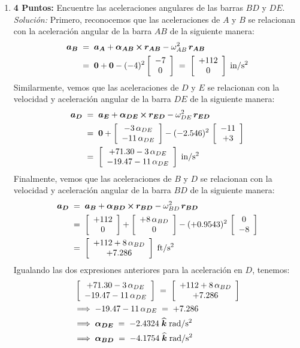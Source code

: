 \documentclass[ a4paper, twoside, 11pt]{article}
\begin{document}
\begin{problem}
\begin{enumerate}[label=\textbf{\alph*)}]
\item \textbf{4 Puntos:} Encuentre las aceleraciones angulares de las barras $BD$ y $DE$. \\[1ex]
\emph{Soluci\'on:} Primero, reconocemos que las aceleraciones de $A$ y $B$ se relacionan con la aceleraci\'on angular de la barra $AB$ de la siguiente manera: 
\begin{align*}
{\boldsymbol{a_B}} \;
& = \; {\boldsymbol{a_A}} + {\boldsymbol{\alpha_{AB}}} \,{\boldsymbol{\times}}\, {\boldsymbol{r_{AB}}} - \omega_{AB}^2 \, {\boldsymbol{r_{AB}}} \\
& = \; {\boldsymbol{0}} + {\boldsymbol{0}} -(-4)^2 \left[ \begin{array}{c} -7 \\ 0 \end{array} \right] \; = \; \left[ \begin{array}{c} +112 \\ 0 \end{array} \right] \; \text{in/s\ensuremath{^{\text{2}}}}
\end{align*}
Similarmente, vemos que las aceleraciones de $D$ y $E$ se relacionan con la velocidad y aceleraci\'on angular de la barra $DE$ de la siguiente manera: 
\begin{align*}
{\boldsymbol{a_D}} \;
& = \; {\boldsymbol{a_E}} + {\boldsymbol{\alpha_{DE}}} \,{\boldsymbol{\times}}\, {\boldsymbol{r_{ED}}} - \omega_{DE}^2 \, {\boldsymbol{r_{ED}}} \\
& = \; {\boldsymbol{0}} + \left[ \begin{array}{c}  -3 \, \alpha_{DE} \\  -11 \, \alpha_{DE} \end{array} \right] - (-2.546)^2 \, \left[ \begin{array}{c} -11 \\ +3 \end{array} \right] \\
& = \; 
\left[ \begin{array}{c}  +71.30 - 3 \, \alpha_{DE} \\  -19.47 - 11 \, \alpha_{DE} \end{array} \right] \; \text{in/s\ensuremath{^{\text{2}}}}
\end{align*}
Finalmente, vemos que las aceleraciones de $B$ y $D$ se relacionan con la velocidad y aceleraci\'on angular de la barra $BD$ de la siguiente manera: 
\begin{align*}
{\boldsymbol{a_D}} \;
& = \; {\boldsymbol{a_B}} + {\boldsymbol{\alpha_{BD}}} \,{\boldsymbol{\times}}\, {\boldsymbol{r_{BD}}} - \omega_{BD}^2 \, {\boldsymbol{r_{BD}}} \\
& = \; \left[ \begin{array}{c} +112 \\ 0 \end{array} \right] + \left[ \begin{array}{c}  +8 \, \alpha_{BD} \\ 0 \end{array} \right] - (+0.9543)^2 \, \left[ \begin{array}{c} 0 \\ -8 \end{array} \right] \\
& = \; 
\left[ \begin{array}{c}  +112 + 8 \, \alpha_{BD} \\ +7.286 \end{array} \right] \; \text{ft/s\ensuremath{^{\text{2}}}}
\end{align*}
Igualando las dos expresiones anteriores para la aceleraci\'on en $D$, tenemos: 
\begin{align*}
&
\left[ \begin{array}{c}  +71.30 - 3 \, \alpha_{DE} \\  -19.47 - 11 \, \alpha_{DE} \end{array} \right] \; = \; \left[ \begin{array}{c}  +112 + 8 \, \alpha_{BD} \\ +7.286 \end{array} \right] \\
& \Longrightarrow \;
-19.47 - 11 \, \alpha_{DE} \; = \; +7.286 \\
& \Longrightarrow \;
{\boldsymbol{\alpha_{DE}}} \; = \; -2.4324 \; {\boldsymbol{\widehat{k}}} \; \text{rad/s\ensuremath{^{\text{2}}}} \\
& \Longrightarrow \;
{\boldsymbol{\alpha_{BD}}} \; = \; -4.1754 \; {\boldsymbol{\widehat{k}}} \; \text{rad/s\ensuremath{^{\text{2}}}}
\end{align*}


\end{enumerate}

\end{problem}
\fullskip
\end{document}
